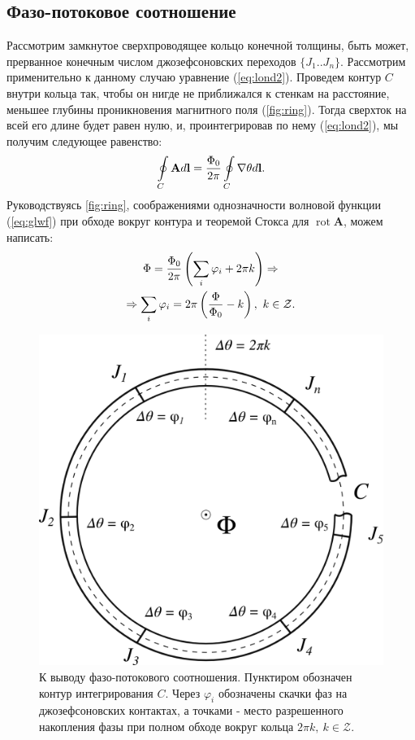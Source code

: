 \documentclass[12pt, twoside]{report}
\numberwithin{equation}{section}
\numberwithin{figure}{section}
\begin{document}
\subsection{Фазо-потоковое соотношение}
Рассмотрим замкнутое сверхпроводящее кольцо конечной толщины, быть может, прерванное конечным числом джозефсоновских переходов $\{J_1..J_n\}$. Рассмотрим применительно к данному случаю уравнение (\ref{eq:lond2}). Проведем контур $C$ внутри кольца так, чтобы он нигде не приближался к стенкам на расстояние, меньшее глубины проникновения магнитного поля (\autoref{fig:ring}). Тогда сверхток на всей его длине будет равен нулю, и, проинтегрировав по нему (\ref{eq:lond2}), мы получим следующее равенство:
\begin{equation}
\oint\displaylimits_C \mathbf{A}d\mathbf{l} = \frac{\Phi_0}{2\pi}\oint\displaylimits_C \nabla \theta d \mathbf{l} \notag.
\end{equation}
Руководствуясь \autoref{fig:ring}, соображениями однозначности волновой функции (\ref{eq:glwf}) при обходе вокруг контура и теоремой Стокса для $\operatorname{rot} \mathbf{A}$, можем написать:
\begin{gather}
\Phi = \frac{\Phi_0}{2\pi}\left(\sum_i \varphi_i + 2\pi k\right) \Rightarrow \notag\\
\Rightarrow \sum_i \varphi_i = 2\pi\left(\frac{\Phi}{\Phi_0} - k\right),\ k\in \mathcal{Z}.
\label{eq:phsflx}
\end{gather}

\begin{figure}[h]
\centering
\includegraphics[width=0.5\linewidth]{Pictures/ring.png}
\caption{К выводу фазо-потокового соотношения. Пунктиром обозначен контур интегрирования $C$. Через $\varphi_i$ обозначены скачки фаз на джозефсоновских контактах, а точками - место разрешенного накопления фазы при полном обходе вокруг кольца $2\pi k,\ k\in\mathcal{Z}$.}
\label{fig:ring}
\end{figure}
\end{document}
